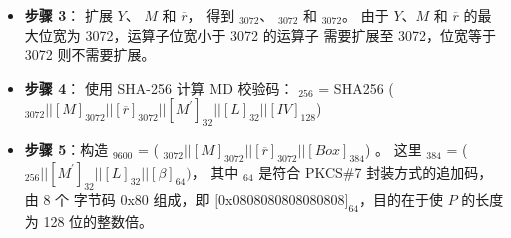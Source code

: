 \documentclass[main\_\_CN.tex]{subfiles}
\begin{document}
\begin{itemize}
    \item {\bfseries 步骤 3}：
          扩展 \begin{math}Y\end{math}、
               \begin{math}M\end{math} 和 
               \begin{math}\overline{r}\end{math}，
          得到 \begin{math}[Y]_{3072}\end{math}、
               \begin{math}[M]_{3072}\end{math} 和
               \begin{math}[\overline{r}]_{3072}\end{math}。
          由于 \begin{math}Y\end{math}、\begin{math}M\end{math} 和 \begin{math}\overline{r}\end{math} 的最大位宽为 3072，运算子位宽小于 3072 的运算子 需要扩展至 3072，位宽等于 3072 则不需要扩展。
       
    
    \item {\bfseries 步骤 4}：
            使用 SHA-256 计算 MD 校验码： 
                \begin{math}[MD]_{256}\end{math} = SHA256 (\begin{math} 
                [Y]_{3072} ||
                [M]_{3072} ||
                [\overline{r}]_{3072} ||
                [M^{\prime}]_{32} ||
                [L]_{32} ||
                [IV]_{128} 
            \end{math})

    \item {\bfseries 步骤 5}：构造 \begin{math}[P]_{9600}\end{math} = (
            \begin{math}
                [Y]_{3072} ||
                [M]_{3072} ||
                [\overline{r}]_{3072} ||
                [Box]_{384}
            \end{math}) 。
            这里 \begin{math}[Box]_{384}\end{math} = (
            \begin{math}
                [MD]_{256} ||
                [M^{\prime}]_{32} ||
                [L]_{32} ||
                [\beta]_{64}) 
            \end{math}，
            其中 \begin{math}[\beta]_{64} \end{math} 是符合 PKCS\#7 封装方式的追加码， 由 8 个 字节码 0x80 组成，即 $[$0x0808080808080808$]_{64}$，目的在于使 \begin{math}P\end{math} 的长度为 128 位的整数倍。
    

\end{itemize}
\end{document}
